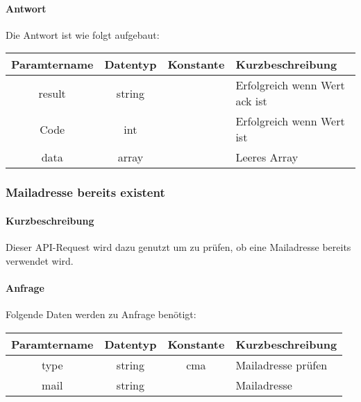 \paragraph{Antwort}Die Antwort ist wie folgt aufgebaut:
\begin{table}[H]
	\begin{tabular}{|c|c|c|p{6.5cm}|}
		\hline
		\textbf{Paramtername} & \textbf{Datentyp} & \textbf{Konstante} & \textbf{Kurzbeschreibung}                                                                                               \\ \hline
		result              & string           &                 & Erfolgreich wenn Wert {\glqq ack\grqq} ist \\ \hline
		Code                & int              &                 & Erfolgreich wenn Wert {\glqq 0\grqq} ist \\ \hline
		data                & array            &                 & Leeres Array \\ \hline
	\end{tabular}
\end{table}
\subsubsection{Mailadresse bereits existent}
\paragraph{Kurzbeschreibung}Dieser API-Request wird dazu genutzt um zu prüfen, ob eine Mailadresse bereits verwendet wird.
\paragraph{Anfrage}Folgende Daten werden zu Anfrage benötigt:
\begin{table}[H]
	\begin{tabular}{|c|c|c|p{6.5cm}|}
		\hline
		\textbf{Paramtername} & \textbf{Datentyp} & \textbf{Konstante} & \textbf{Kurzbeschreibung}                                                                                               \\ \hline
		type                & string            & cma                & Mailadresse prüfen \\ \hline
		mail				& string			& 					 & Mailadresse\\ \hline
	\end{tabular}
\end{table}

